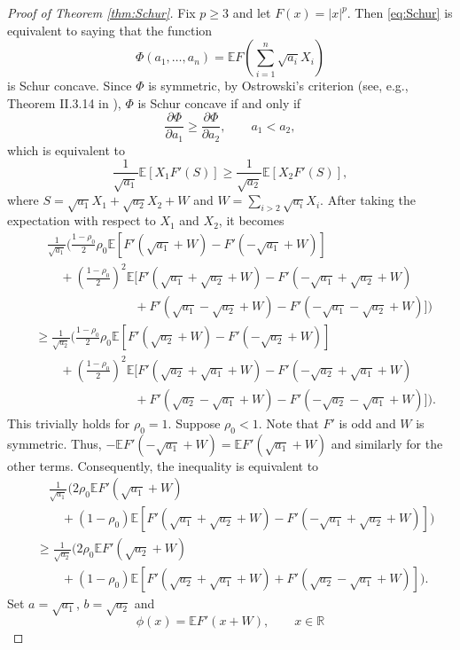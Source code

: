 \documentclass[10pt]{article}
\newcommand{\E}{\mathbb{E}}
\newcommand{\1}{\textbf{1}}
\newcommand{\R}{\mathbb{R}}
\theoremstyle{remark}
\theoremstyle{definition}
\begin{document}
\begin{proof}[Proof of Theorem \ref{thm:Schur}]
Fix $p \geq 3$ and let $F(x) = |x|^p$. Then \eqref{eq:Schur} is equivalent to saying that the function
\[
\Phi(a_1,\ldots,a_n) = \E F\left(\sum_{i=1}^n \sqrt{a_i}X_i\right)
\]
is Schur concave. Since $\Phi$ is symmetric, by Ostrowski's criterion (see, e.g., Theorem II.3.14 in \cite{Bh}), $\Phi$ is Schur concave if and only if
\[
\frac{\partial \Phi}{\partial a_1} \geq \frac{\partial \Phi}{\partial a_2}, \qquad a_1 < a_2,
\]
which is equivalent to
\[
\frac{1}{\sqrt{a_1}}\E[ X_1F'(S)] \geq \frac{1}{\sqrt{a_2}}\E[X_2 F'(S)],
\]
where $S = \sqrt{a_1}X_1+\sqrt{a_2}X_2 + W$ and $W = \sum_{i>2} \sqrt{a_i}X_i$.
After taking the expectation with respect to $X_1$ and $X_2$, it becomes
\begin{align*}
&\quad \frac{1}{\sqrt{a_1}}\Bigg(\frac{1-\rho_0}{2}\rho_0\E[F'(\sqrt{a_1}+W) - F'(-\sqrt{a_1}+W)] \\
&\qquad+ \left(\frac{1-\rho_0}{2}\right)^2 \E[ F'(\sqrt{a_1}+ \sqrt{a_2} +  W) - F'(-\sqrt{a_1} + \sqrt{a_2} + W) \\
&\qquad\qquad\qquad\qquad + F'(\sqrt{a_1} - \sqrt{a_2} + W) - F'(-\sqrt{a_1} - \sqrt{a_2} + W)  ]\Bigg) \\
&\geq \frac{1}{\sqrt{a_2}}\Bigg(\frac{1-\rho_0}{2}\rho_0\E[F'(\sqrt{a_2}+W) - F'(-\sqrt{a_2}+W)] \\
&\qquad+ \left(\frac{1-\rho_0}{2}\right)^2 \E[ F'(\sqrt{a_2}+ \sqrt{a_1} +  W) - F'(-\sqrt{a_2} + \sqrt{a_1} + W) \\
&\qquad\qquad\qquad\qquad + F'(\sqrt{a_2} - \sqrt{a_1} + W) - F'(-\sqrt{a_2} - \sqrt{a_1} + W)  ]\Bigg).
\end{align*}
This trivially holds for $\rho_0 = 1$. Suppose $\rho_0 < 1$.
Note that $F'$ is odd and $W$ is symmetric. Thus, $-\E F'(-\sqrt{a_1}+W) = \E F'(\sqrt{a_1}+W)$ and similarly for the other terms. Consequently, the inequality is equivalent to
\begin{align*}
&\quad \frac{1}{\sqrt{a_1}}\Bigg(2\rho_0\E F'(\sqrt{a_1}+W) \\
&\qquad+ (1-\rho_0) \E[ F'(\sqrt{a_1}+ \sqrt{a_2} +  W) - F'(-\sqrt{a_1} + \sqrt{a_2} + W) ]\Bigg) \\
&\geq \frac{1}{\sqrt{a_2}}\Bigg(2\rho_0\E F'(\sqrt{a_2}+W) \\
&\qquad+(1-\rho_0) \E[ F'(\sqrt{a_2}+ \sqrt{a_1} +  W) + F'(\sqrt{a_2} - \sqrt{a_1} + W) ]\Bigg).
\end{align*}
Set $a = \sqrt{a_1}$, $b = \sqrt{a_2}$ and
\[
\phi(x) = \E F'(x+W), \qquad x \in \R
\]
\end{proof}
\end{document}
